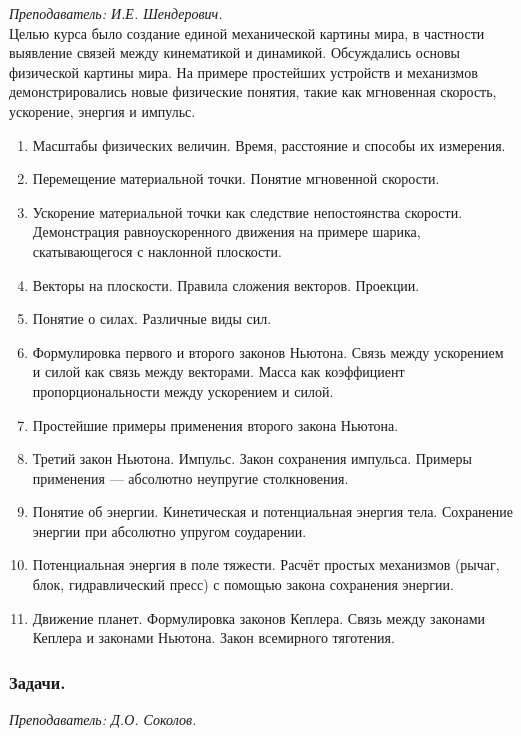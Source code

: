\documentclass[12pt]{article}
\newlength{\h}
\newlength{\x}
\begin{document}
\textit{Преподаватель: И.Е. Шендерович.}\\

Целью курса было создание единой механической картины мира, в
частности выявление связей между кинематикой и динамикой. Обсуждались
основы физической картины мира. На примере простейших устройств и
механизмов демонстрировались новые физические понятия, такие как
мгновенная скорость, ускорение, энергия и импульс.

\begin{enumerate}
\item Масштабы физических величин. Время, расстояние и способы их
  измерения. 
\item Перемещение материальной точки. Понятие мгновенной скорости.
\item Ускорение материальной точки как следствие непостоянства
  скорости. Демонстрация равноускоренного движения на примере
  шарика, скатывающегося с наклонной плоскости.
\item Векторы на плоскости. Правила сложения векторов. Проекции.
\item Понятие о силах. Различные виды сил.
\item Формулировка первого и второго законов Ньютона. Связь между
  ускорением и силой как связь между векторами. Масса как коэффициент
  пропорциональности между ускорением и силой. 
\item Простейшие примеры применения второго закона Ньютона.
\item Третий закон Ньютона. Импульс. Закон сохранения
  импульса. Примеры применения --- абсолютно неупругие столкновения.
\item Понятие об энергии. Кинетическая и потенциальная энергия
  тела. Сохранение энергии при абсолютно упругом соударении.
\item Потенциальная энергия в поле тяжести. Расчёт простых механизмов
  (рычаг, блок, гидравлический пресс) с помощью закона сохранения
  энергии.
\item Движение планет. Формулировка законов Кеплера. Связь между
  законами Кеплера и законами Ньютона. Закон всемирного тяготения. 
\end{enumerate}

\subsubsection{Задачи.}
\label{sec:daily8pr}

\textit{Преподаватель: Д.О. Соколов. }\\
\end{document}
